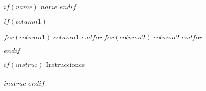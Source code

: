 \documentclass[$if(fontsize)$$fontsize$,$endif$$if(lang)$$lang$,$endif$$if(papersize)$$papersize$,$endif$$for(classoption)$$classoption$$sep$,$endfor$]{$documentclass$}
\begin{document}
$if(name)$
  {\noindent \huge $name$}
  \vspace{1cm}
$endif$

$if(column1)$
  \begin{multicols}{2}
  \noindent 
  $for(column1)$
    $column1$\newline
  $endfor$
  $for(column2)$
    $column2$\newline
  $endfor$
  \end{multicols}
  \vspace{1cm}
$endif$

$if(instruc)$
  {\noindent \LARGE Instrucciones}\\
  \\
  \noindent  $instruc$
$endif$
\end{document}
